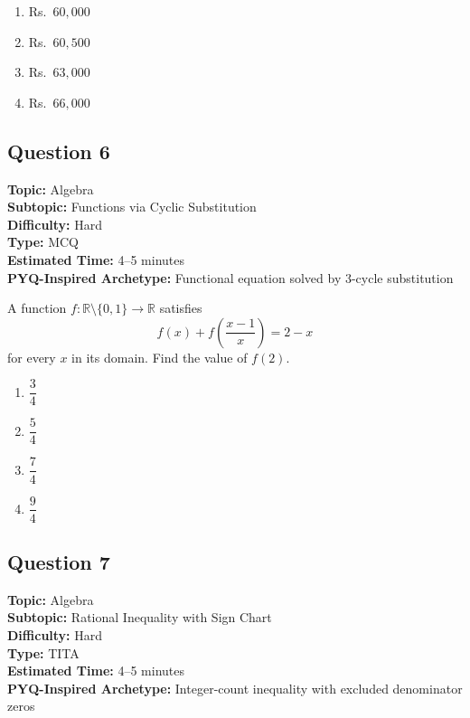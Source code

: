 \documentclass[11pt]{article}
\begin{document}
\begin{enumerate}[label=(\Alph*)]
    \item Rs.~\(60{,}000\)
    \item Rs.~\(60{,}500\)
    \item Rs.~\(63{,}000\)
    \item Rs.~\(66{,}000\)
\end{enumerate}

\subsection*{Question 6}

\textbf{Topic:} Algebra \\
\textbf{Subtopic:} Functions via Cyclic Substitution \\
\textbf{Difficulty:} Hard \\
\textbf{Type:} MCQ \\
\textbf{Estimated Time:} 4--5 minutes \\
\textbf{PYQ-Inspired Archetype:} Functional equation solved by 3-cycle substitution

\begin{tcolorbox}
A function \(f:\mathbb{R}\setminus\{0,1\}\to\mathbb{R}\) satisfies
\[
f(x) + f\!\left(\frac{x-1}{x}\right) = 2 - x
\]
for every \(x\) in its domain. Find the value of \(f(2)\).
\end{tcolorbox}

\begin{enumerate}[label=(\Alph*)]
    \item \(\dfrac{3}{4}\)
    \item \(\dfrac{5}{4}\)
    \item \(\dfrac{7}{4}\)
    \item \(\dfrac{9}{4}\)
\end{enumerate}

\subsection*{Question 7}

\textbf{Topic:} Algebra \\
\textbf{Subtopic:} Rational Inequality with Sign Chart \\
\textbf{Difficulty:} Hard \\
\textbf{Type:} TITA \\
\textbf{Estimated Time:} 4--5 minutes \\
\textbf{PYQ-Inspired Archetype:} Integer-count inequality with excluded denominator zeros
\end{document}
